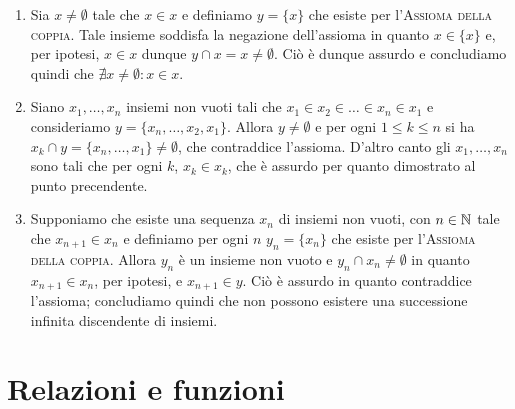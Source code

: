 \documentclass[a4paper]{article}\par \usepackage{style}\par
\begin{document}
\begin{enumerate}
\item Sia $ x \neq \emptyset $ tale che $ x \in x $ e definiamo $ y = \{x\} $ che esiste per l'\textsc{Assioma della coppia}. Tale insieme soddisfa la negazione dell'assioma in quanto $ x \in \{x\} $ e, per ipotesi, $ x \in x $ dunque $ y \cap x = x \neq \emptyset $. Ciò è dunque assurdo e concludiamo quindi che $ \nexists x \neq \emptyset : x \in x $.
\item Siano $ x_1, \dots, x_n $ insiemi non vuoti tali che $ x_1 \in x_2 \in \dots \in x_n \in x_1 $ e consideriamo  $ y = \{x_n, \dots, x_2, x_1\} $. Allora $ y \neq \emptyset $ e per ogni $ 1 \leq k \leq n $ si ha $ x_k \cap y = \{x_n, \dots, x_1\} \neq \emptyset $, che contraddice l'assioma. D'altro canto gli $ x_1, \dots, x_n $ sono tali che per ogni $ k $, $ x_k \in x_k $, che è assurdo per quanto dimostrato al punto precendente.
\item Supponiamo che esiste una sequenza $ x_n $ di insiemi non vuoti, con $ n \in \mathbb{N} $ tale che $ x_{n+1} \in x_n $ e definiamo per ogni $ n $ $ y_n = \{x_n\} $ che esiste per l'\textsc{Assioma della coppia}. Allora $ y_n $ è un insieme non vuoto e $ y_n \cap x_n \neq \emptyset $ in quanto $ x_{n+1} \in x_n $, per ipotesi, e $ x_{n+1} \in y $. Ciò è assurdo in quanto contraddice l'assioma; concludiamo quindi che non possono esistere una successione infinita discendente di insiemi.
\end{enumerate}\par \section{Relazioni e funzioni}
\end{document}
